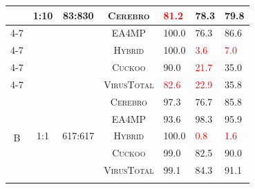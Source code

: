 \begin{table}[!t]
\begin{tabular}{|c|c|c|c|l|l|l|}
                    & \multirow{5}{*}{1:10} & \multirow{5}{*}{83:830} & \textsc{Cerebro}    & \textcolor{red}{81.2}      & 78.3                      & 79.8       \\ \cline{4-7} 
                    &                       &                         & \textsc{EA4MP}      & 100.0                     & 76.3                     & \textcolor{green!80!black}{86.6}       \\ \cline{4-7}
                    &                       &                         & \textsc{Hybrid}     & 100.0                    & \textcolor{red}{3.6}      & \textcolor{red}{7.0}       \\ \cline{4-7} 
                    &                       &                         & \textsc{Cuckoo}     & 90.0                       & \textcolor{red}{21.7}      & 35.0       \\ \cline{4-7} 
                    &                       &                         & \textsc{VirusTotal} & \textcolor{red}{82.6}     & \textcolor{red}{22.9}      & 35.8       \\ \hline

\multirow{15}{*}{B} & \multirow{5}{*}{1:1}  & \multirow{5}{*}{617:617}   & \textsc{Cerebro}    & 97.3        & 76.7                  & 85.8       \\ \cline{4-7} 
                    &                       &                            & \textsc{EA4MP}      & 93.6     & \textcolor{green!80!black}{98.3}    & \textcolor{green!80!black}{95.9}       \\ \cline{4-7} 
                    &                       &                            & \textsc{Hybrid}     & 100.0     & \textcolor{red}{0.8}    & \textcolor{red}{1.6}       \\ \cline{4-7} 
                    &                       &                            & \textsc{Cuckoo}     & 99.0     & 82.5                     & 90.0       \\ \cline{4-7} 
                    &                       &                            & \textsc{VirusTotal} & 99.1     & 84.3                     & 91.1       \\ \cline{2-7} 
                    

\end{tabular}
\end{table}
